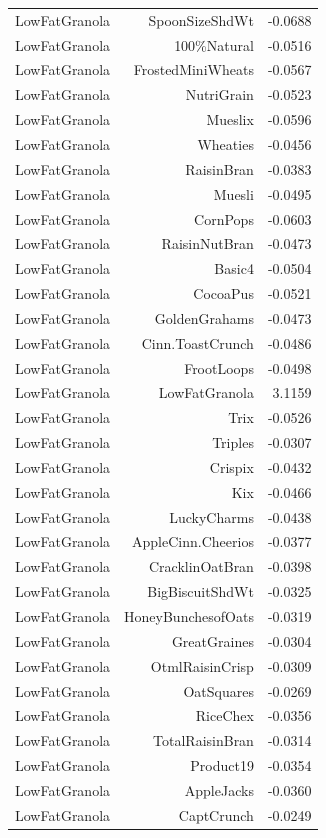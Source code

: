 \begin{longtable}{@{}lrr@{}}
LowFatGranola & SpoonSizeShdWt & -0.0688 \\
LowFatGranola & 100\%Natural & -0.0516 \\
LowFatGranola & FrostedMiniWheats & -0.0567 \\
LowFatGranola & NutriGrain & -0.0523 \\
LowFatGranola & Mueslix & -0.0596 \\
LowFatGranola & Wheaties & -0.0456 \\
LowFatGranola & RaisinBran & -0.0383 \\
LowFatGranola & Muesli & -0.0495 \\
LowFatGranola & CornPops & -0.0603 \\
LowFatGranola & RaisinNutBran & -0.0473 \\
LowFatGranola & Basic4 & -0.0504 \\
LowFatGranola & CocoaPus & -0.0521 \\
LowFatGranola & GoldenGrahams & -0.0473 \\
LowFatGranola & Cinn.ToastCrunch & -0.0486 \\
LowFatGranola & FrootLoops & -0.0498 \\
LowFatGranola & LowFatGranola & 3.1159 \\
LowFatGranola & Trix & -0.0526 \\
LowFatGranola & Triples & -0.0307 \\
LowFatGranola & Crispix & -0.0432 \\
LowFatGranola & Kix & -0.0466 \\
LowFatGranola & LuckyCharms & -0.0438 \\
LowFatGranola & AppleCinn.Cheerios & -0.0377 \\
LowFatGranola & CracklinOatBran & -0.0398 \\
LowFatGranola & BigBiscuitShdWt & -0.0325 \\
LowFatGranola & HoneyBunchesofOats & -0.0319 \\
LowFatGranola & GreatGraines & -0.0304 \\
LowFatGranola & OtmlRaisinCrisp & -0.0309 \\
LowFatGranola & OatSquares & -0.0269 \\
LowFatGranola & RiceChex & -0.0356 \\
LowFatGranola & TotalRaisinBran & -0.0314 \\
LowFatGranola & Product19 & -0.0354 \\
LowFatGranola & AppleJacks & -0.0360 \\
LowFatGranola & CaptCrunch & -0.0249 \\

\end{longtable}
